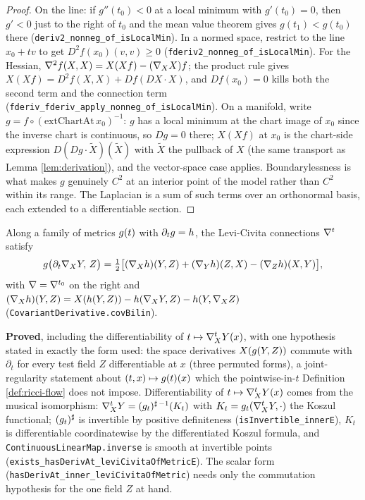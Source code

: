 \begin{proof}
  \leanok
  On the line: if $g'' (t_0) < 0$ at a local minimum with $g'(t_0) = 0$,
  then $g' < 0$ just to the right of $t_0$ and the mean value theorem gives
  $g(t_1) < g(t_0)$ there (\texttt{deriv2\_nonneg\_of\_isLocalMin}). In a
  normed space, restrict to the line $x_0 + tv$ to get
  $D^2 f(x_0)(v,v) \ge 0$ (\texttt{fderiv2\_nonneg\_of\_isLocalMin}). For the
  Hessian, $\nabla^2 f(X,X) = X(Xf) - (\nabla_X X) f$; the product rule gives
  $X(Xf) = D^2f(X,X) + Df(DX\cdot X)$, and $Df(x_0) = 0$ kills both the second
  term and the connection term
  (\texttt{fderiv\_fderiv\_apply\_nonneg\_of\_isLocalMin}). On a manifold,
  write $g = f \circ (\mathrm{extChartAt}\, x_0)^{-1}$: $g$ has a local
  minimum at the chart image of $x_0$ since the inverse chart is continuous,
  so $Dg = 0$ there; $X(Xf)$ at $x_0$ is the chart-side expression
  $D(Dg \cdot \tilde X)(\tilde X)$ with $\tilde X$ the pullback of $X$ (the
  same transport as Lemma \ref{lem:derivation}), and the vector-space case
  applies. Boundarylessness is what makes $g$ genuinely $C^2$ at an interior
  point of the model rather than $C^2$ within its range. The Laplacian is a
  sum of such terms over an orthonormal basis, each extended to a
  differentiable section.
\end{proof}

\begin{lemma}
  \label{lem:variation-connection}
  \leanok
  Along a family of metrics $g(t)$ with $\partial_t g = h$, the Levi-Civita
  connections $\nabla^t$ satisfy
  \[
    g\bigl(\partial_t \nabla_X Y,\, Z\bigr)
      = \tfrac12\bigl[(\nabla_X h)(Y,Z) + (\nabla_Y h)(Z,X) - (\nabla_Z h)(X,Y)\bigr],
  \]
  with $\nabla = \nabla^{t_0}$ on the right and
  $(\nabla_X h)(Y,Z) = X(h(Y,Z)) - h(\nabla_X Y, Z) - h(Y, \nabla_X Z)$
  (\texttt{CovariantDerivative.covBilin}).

  \textbf{Proved}, including the differentiability of $t \mapsto \nabla^t_X Y(x)$,
  with one hypothesis stated in exactly the form used: the space derivatives
  $X(g(Y,Z))$ commute with $\partial_t$ for every test field $Z$
  differentiable at $x$ (three permuted forms), a joint-regularity statement
  about $(t,x) \mapsto g(t)(x)$ which the pointwise-in-$t$ Definition
  \ref{def:ricci-flow} does not impose. Differentiability of
  $t \mapsto \nabla^t_X Y(x)$ comes from the musical isomorphism:
  $\nabla^t_X Y = (g_t)^{\sharp\,-1}(K_t)$ with $K_t = g_t(\nabla^t_X Y, \cdot)$
  the Koszul functional; $(g_t)^\sharp$ is invertible by positive
  definiteness (\texttt{isInvertible\_innerE}), $K_t$ is differentiable
  coordinatewise by the differentiated Koszul formula, and
  \texttt{ContinuousLinearMap.inverse} is smooth at invertible points
  (\texttt{exists\_hasDerivAt\_leviCivitaOfMetricE}). The scalar form
  (\texttt{hasDerivAt\_inner\_leviCivitaOfMetric}) needs only the commutation
  hypothesis for the one field $Z$ at hand.
\end{lemma}

